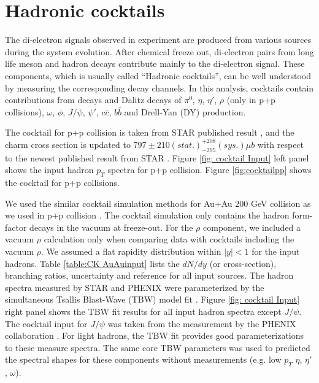 \section{Hadronic cocktails}

The di-electron signals observed in experiment are produced from various
sources during the system evolution. After chemical freeze out, di-electron
pairs from long life meson and hadron decays contribute mainly to
the di-electron signal. These components, which is usually called
``Hadronic cocktails'', can be well understood by measuring the
corresponding decay channels. In this analysis, cocktails contain
contributions from decays and Dalitz decays of $\pi^{0}$, $\eta$,
$\eta'$, $\rho$ (only in p+p collisions), $\omega$, $\phi$, $J/\psi$,
$\psi'$, $c\bar{c}$, $b\bar{b}$ and Drell-Yan (DY) production. 

The cocktail for p+p collision is taken from STAR published result
\cite{PhysRevC.86.024906}, and the charm cross section is updated
to $797\pm210(stat.)_{-295}^{+208}(sys.)\mu b$ with respect to the
newest published result from STAR \cite{PhysRevD.86.072013}. Figure
\ref{fig: cocktail Input} left panel shows the input hadron $p_{T}$
spectra for p+p collision. Figure \ref{fig:cocktailpp} shows the
cocktail for p+p collisions.

We used the similar cocktail simulation methods for Au+Au 200 GeV
collision as we used in p+p collision \cite{PhysRevC.86.024906}.
The cocktail simulation only contains the hadron form-factor decays
in the vacuum at freeze-out. For the $\rho$ component, we included
a vacuum $\rho$ calculation only when comparing data with cocktails
including the vacuum $\rho$. We assumed a flat rapidity distribution
within $|y|<1$ for the input hadrons. Table \ref{table:CK AuAuinput}
lists the $dN/dy$ (or cross-section), branching ratios, uncertainty
and reference for all input sources. The hadron spectra measured by
STAR and PHENIX were parameterized by the simultaneous Tsallis Blast-Wave
(TBW) model fit \cite{PhysRevC.79.051901}. Figure \ref{fig: cocktail Input}
right panel shows the TBW fit results for all input hadron spectra
except $J/\psi$. The cocktail input for $J/\psi$ was taken from
the measurement by the PHENIX collaboration \cite{PhysRevC.81.034911}.
For light hadrons, the TBW fit provides good parameterizations to
these measure spectra. The same core TBW parameters was used to predicted
the spectral shapes for these components without measurements (e.g.
low $p_{T}$ $\eta$, $\eta'$, $\omega$).


